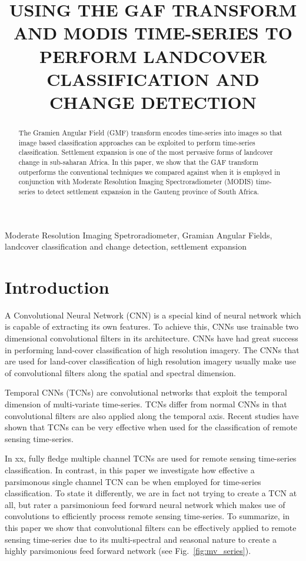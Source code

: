 \documentclass{article}
\title{USING THE GAF TRANSFORM AND MODIS TIME-SERIES TO PERFORM LANDCOVER CLASSIFICATION AND CHANGE DETECTION}
\begin{document}
%
\maketitle
%
\begin{abstract}
The Gramien Angular Field (GMF) transform encodes time-series into images so that image based classification approaches can be exploited to perform time-series classification. Settlement expansion is one of the most pervasive forms of landcover change in sub-saharan Africa. In this paper, we show that the GAF transform outperforms the conventional techniques we compared against when it is employed in conjunction with Moderate Resolution Imaging Spectroradiometer (MODIS) time-series to detect settlement expansion in the Gauteng province of South Africa.   
\end{abstract}
%
\begin{keywords}
Moderate Resolution Imaging Spetroradiometer, Gramian Angular Fields, landcover classification and change detection, settlement expansion
\end{keywords}
%
\section{Introduction}
\label{sec:intro}
A Convolutional Neural Network (CNN) is a special kind of neural network which is capable of extracting its own features. To achieve this, CNNs use trainable two dimensional convolutional filters in its architecture. CNNs have had great success in performing land-cover classification of high resolution imagery. The CNNs that are used for land-cover classification of high resolution imagery usually make use of convolutional filters along the spatial and spectral dimension.

Temporal CNNs (TCNs) are convolutional networks that
exploit the temporal dimension of multi-variate time-series. TCNs differ from normal CNNs in that convolutional filters are also applied along the temporal axis. Recent studies have shown that TCNs can be very effective when used for the classification of remote sensing time-series. 

In xx, fully fledge multiple channel TCNs are used for remote sensing time-series classification. In contrast, in this paper we investigate how effective a parsimonous single channel TCN can be when employed for time-series classification. To state it differently, we are in fact not trying to create a TCN at all, but rater a parsimonioun feed forward neural network which makes use of convolutions to efficiently process remote sensing time-series. To summarize, in this paper we show that convolutional filters can be effectively applied to remote sensing time-series due to its multi-spectral and seasonal nature to create a highly parsimonious feed forward network (see Fig.~\ref{fig:mv_series}).   
\end{document}
